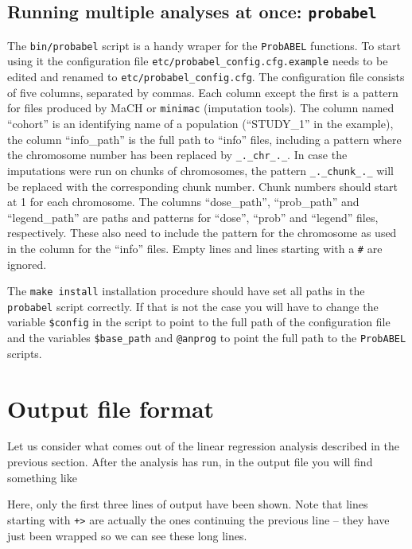 \documentclass[12pt,a4paper]{article}
\newcommand{\PA}{\texttt{ProbABEL}}
\begin{document}
\subsection{Running multiple analyses at once: \texttt{probabel}}
The \texttt{bin/probabel} script is a handy wraper for the \PA{}
functions. To start using it the configuration file
\texttt{etc/probabel\_config.cfg.example} needs to be edited and
renamed to \texttt{etc/probabel\_config.cfg}. The configuration file
consists of five columns, separated by commas. Each column except the
first is a pattern for files produced by MaCH or \texttt{minimac}
(imputation tools). The column named ``cohort'' is an identifying name
of a population (``STUDY\_1'' in the example), the column
``info\_path'' is the full path to ``info'' files, including a pattern
where the chromosome number has been replaced by
\texttt{\_.\_chr\_.\_}. In case the imputations were run on chunks of
chromosomes, the pattern \texttt{\_.\_chunk\_.\_} will be replaced
with the corresponding chunk number. Chunk numbers should start at 1
for each chromosome. The columns ``dose\_path'', ``prob\_path'' and
``legend\_path'' are paths and patterns for ``dose'', ``prob'' and
``legend'' files, respectively. These also need to include the pattern
for the chromosome as used in the column for the ``info'' files.
Empty lines and lines starting with a \texttt{\#} are ignored.

The \texttt{make install} installation procedure should have set all
paths in the \texttt{probabel} script correctly. If that is not the
case you will have to change the variable \texttt{\$config} in the
script to point to the full path of the configuration file and the
variables \texttt{\$base\_path} and \texttt{@anprog} to point the full
path to the \PA{} scripts.


\section{Output file format}
Let us consider what comes out of the linear regression analysis
described in the previous section. After the analysis has run, in
the output file you will find something like
\begin{small}

\end{small}

Here, only the first three lines of output have been shown. Note that lines
starting with \texttt{+>} are actually the ones continuing the
previous line -- they have just been wrapped so we can see
these long lines.
\end{document}
